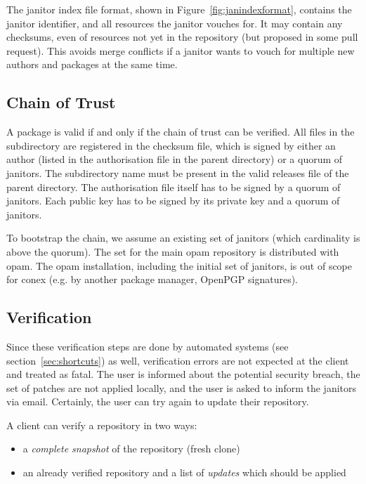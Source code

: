 \documentclass[nocopyrightspace]{sigplanconf}
\newcommand{\TODO}[1]{\textbf{[TODO: #1]}}
\begin{document}
The janitor index file format, shown in Figure~\ref{fig:janindexformat}, contains the janitor identifier, and all resources the janitor vouches for.
It may contain any checksums, even of resources not yet in the repository (but proposed in some pull request).
This avoids merge conflicts if a janitor wants to vouch for multiple new authors and packages at the same time.

\subsection{Chain of Trust}
A package is valid if and only if the chain of trust can be verified.
All files in the subdirectory are registered in the checksum file, which is signed by either an author (listed in the authorisation file in the parent directory) or a quorum of janitors.
The subdirectory name must be present in the valid releases file of the parent directory.
The authorisation file itself has to be signed by a quorum of janitors.
Each public key has to be signed by its private key and a quorum of janitors.

To bootstrap the chain, we assume an existing set of janitors (which cardinality is above the quorum).
The set for the main opam repository is distributed with opam.
The opam installation, including the initial set of janitors, is out of scope for conex (e.g. by another package manager, OpenPGP signatures).

\subsection{Verification}
Since these verification steps are done by automated systems (see section~\ref{sec:shortcuts}) as well, verification errors are not expected at the client and treated as fatal.
The user is informed about the potential security breach, the set of patches are not applied locally, and the user is asked to inform the janitors via email.
Certainly, the user can try again to update their repository.

A client can verify a repository in two ways:
\begin{itemize}
  \item a \emph{complete snapshot} of the repository (fresh clone)
  \item an already verified repository and a list of \emph{updates} which should be applied
\end{itemize}
\end{document}
